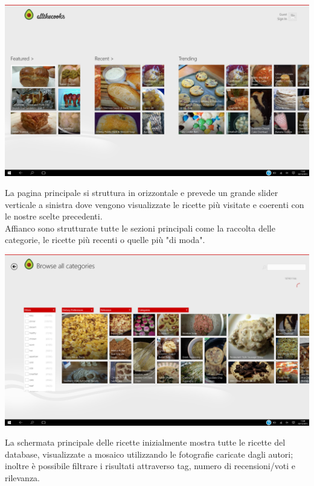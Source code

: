 \begin{center}
\includegraphics[scale=0.275] {img/Allthecooks/home_3.png}  
\end{center}

La pagina principale si struttura in orizzontale e prevede un grande slider verticale a sinistra dove vengono visualizzate le ricette più visitate e coerenti con le nostre scelte precedenti.\\
Affianco sono strutturate tutte le sezioni principali come la raccolta delle categorie, le ricette più recenti o quelle più "di moda".\\


\begin{center}
\includegraphics[scale=0.27] {img/Allthecooks/categorie.png}  
\end{center}

La schermata principale delle ricette inizialmente mostra tutte le ricette del database, visualizzate a mosaico utilizzando le fotografie caricate dagli autori; inoltre è possibile filtrare i risultati attraverso tag, numero di recensioni/voti e rilevanza.\\


